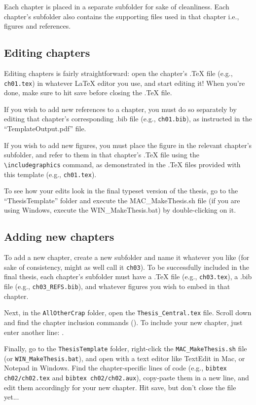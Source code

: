 \documentclass[12pt]{report} %
\begin{document}
Each chapter is placed in a separate subfolder for sake of cleanliness. Each chapter's subfolder also contains the supporting files used in that chapter i.e., figures and references.

\subsection*{Editing chapters}
Editing chapters is fairly straightforward: open the chapter's .TeX file (e.g., \verb|ch01.tex|) in whatever \LaTeX{} editor you use, and start editing it! When you're done, make sure to hit save before closing the .TeX file. 

If you wish to add new references to a chapter, you must do so separately by editing that chapter's corresponding .bib file (e.g., \verb|ch01.bib|), as instructed in the ``TemplateOutput.pdf'' file.

If you wish to add new figures, you must place the figure in the relevant chapter's subfolder, and refer to them in that chapter's .TeX file using the \verb|\includegraphics| command, as demonstrated in the .TeX files provided with this template (e.g., \verb|ch01.tex|).

To see how your edits look in the final typeset version of the thesis, go to the ``ThesisTemplate'' folder and execute the MAC\_{}MakeThesis.sh file (if you are using Windows, execute the WIN\_{}MakeThesis.bat) by double-clicking on it.

\subsection*{Adding new chapters}
To add a new chapter, create a new subfolder and name it whatever you like (for sake of consistency, might as well call it \verb|ch03|). To be successfully included in the final thesis, each chapter's subfolder must have a .TeX file (e.g., \verb|ch03.tex|), a .bib file (e.g., \verb|ch03_REFS.bib|), and whatever figures you wish to embed in that chapter.

Next, in the \verb|AllOtherCrap| folder, open the \verb|Thesis_Central.tex| file. Scroll down and find the chapter inclusion commands (\verb||). To include your new chapter, just enter another line: \verb||.

Finally, go to the \verb|ThesisTemplate| folder, right-click the \verb|MAC_MakeThesis.sh| file (or \verb|WIN_MakeThesis.bat|), and open with a text editor like TextEdit in Mac, or Notepad in Windows. Find the chapter-specific lines of code (e.g., \verb|bibtex ch02/ch02.tex| and \verb|bibtex ch02/ch02.aux|), copy-paste them in a new line, and edit them accordingly for your new chapter. Hit save, but don't close the file yet...
\end{document}
